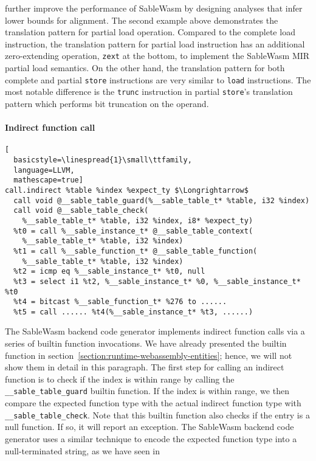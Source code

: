 further improve the performance of SableWasm by designing analyses that infer
lower bounds for alignment. The second example above demonstrates the
translation pattern for partial load operation. Compared to the complete load
instruction, the translation pattern for partial load instruction has an
additional zero-extending operation, \texttt{zext} at the bottom, to implement
the SableWasm MIR partial load semantics. On the other hand, the translation
pattern for both complete and partial \texttt{store} instructions are very
similar to \texttt{load} instructions. The most notable difference is the
\texttt{trunc} instruction in partial \texttt{store}'s translation pattern
which performs bit truncation on the operand.

\paragraph{Indirect function call} \quad
\begin{lstlisting}[
  basicstyle=\linespread{1}\small\ttfamily, 
  language=LLVM, 
  mathescape=true]
call.indirect %table %index %expect_ty $\Longrightarrow$ 
  call void @__sable_table_guard(%__sable_table_t* %table, i32 %index)
  call void @__sable_table_check(
    %__sable_table_t* %table, i32 %index, i8* %expect_ty)
  %t0 = call %__sable_instance_t* @__sable_table_context(
    %__sable_table_t* %table, i32 %index)
  %t1 = call %__sable_function_t* @__sable_table_function(
    %__sable_table_t* %table, i32 %index)
  %t2 = icmp eq %__sable_instance_t* %t0, null
  %t3 = select i1 %t2, %__sable_instance_t* %0, %__sable_instance_t* %t0
  %t4 = bitcast %__sable_function_t* %276 to ......
  %t5 = call ...... %t4(%__sable_instance_t* %t3, ......)
\end{lstlisting}
The SableWasm backend code generator implements indirect function calls via a
series of builtin function invocations. We have already presented the builtin
function in section~\ref{section:runtime-webassembly-entities}; hence, we will
not show them in detail in this
paragraph. The first step for calling an indirect function is to check if the
index is within range by calling the \texttt{\_\_sable\_table\_guard} builtin
function. If the index is within range, we then compare the expected function
type with the actual indirect function type with
\texttt{\_\_sable\_table\_check}. Note that this builtin function also checks
if the entry is a null function. If so, it will report an exception. The
SableWasm backend code generator uses a similar technique to encode the
expected function type into a null-terminated string, as we have seen in
